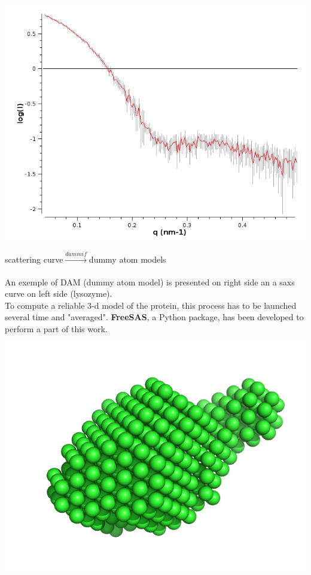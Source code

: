 \documentclass[12pt]{article}
\begin{document}
\begin{minipage}{0.20\linewidth}
    \begin{flushleft}
    \includegraphics[scale=0.22]{saxscurve.png}
    \end{flushleft}
\end{minipage} \hfill
\begin{minipage}{0.55\linewidth}
    \begin{center}\begin{large}
    scattering curve$\xrightarrow[]{dammif}$dummy atom models
    \end{large}\end{center}

    An exemple of DAM (dummy atom model) is presented on right side 
    an a saxs curve on left side (lysozyme).\\
    To compute a reliable 3-d model of the protein, this process has to 
    be launched several time and "averaged". 
    \textbf{FreeSAS}, a Python package, has been developed to perform a 
    part of this work.
\end{minipage} \hfill
\begin{minipage}{0.20\linewidth}
    \begin{flushleft}
    \includegraphics[scale=0.2]{model.png}
    \end{flushleft}
\end{minipage}
\end{document}
